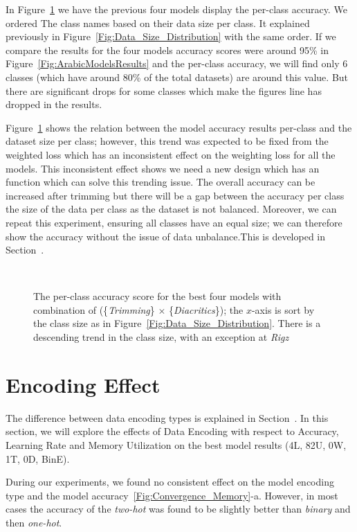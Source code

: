 In Figure~\ref{Fig:Results_Per_Class} we have the previous four models display the per-class accuracy. We ordered The class names based on their data size per class. It explained previously in Figure~\ref{Fig:Data_Size_Distribution} with the same order. If we compare the results for the four models accuracy scores were around 95\% in Figure~\ref{Fig:ArabicModelsResults} and the per-class accuracy, we will find only 6 classes (which have around 80\% of the total datasets) are around this value. But there are significant drops for some classes which make the figures line has dropped in the results.


Figure~\ref{Fig:Results_Per_Class} shows the relation between the model accuracy results per-class and the dataset size per class; however, this trend was expected to be fixed from the weighted loss which has an inconsistent effect on the weighting loss for all the models. This inconsistent effect shows we need a new design which has an function which can solve this trending issue. The overall accuracy can be increased after trimming but there will be a gap between the accuracy per class the size of the data per class as the dataset is not balanced. Moreover, we can repeat this experiment, ensuring all classes have an equal size; we can therefore show the accuracy without the issue of data unbalance.This is developed in Section~.


\begin{figure}[!t]
 
 \caption{The per-class accuracy score for the best four models with combination of (\{\textit{Trimming}\} $\times$ \{\textit{Diacritics}\}); the $x$-axis is sort by the class size as in Figure~\ref{Fig:Data_Size_Distribution}. There is a descending trend in the class size, with an exception at \textit{Rigz}}~\label{Fig:Results_Per_Class}
\end{figure}

\section{Encoding Effect}


The difference between data encoding types is explained in Section~. 
In this section, we will explore the effects of Data Encoding with respect to Accuracy, Learning Rate and Memory Utilization on the best model results (4L, 82U, 0W, 1T, 0D, BinE). 

During our experiments, we found no consistent effect on the model encoding type and the model accuracy~\ref{Fig:Convergence_Memory}-a. However, in most cases the accuracy of the \textit{two-hot} was found to be slightly better than \textit{binary} and then \textit{one-hot}.


